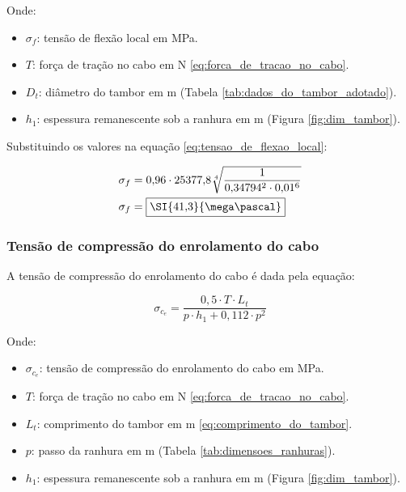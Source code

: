 Onde:

\begin{itemize}
  \item $\sigma_f$: tensão de flexão local em \si{\mega\pascal}.
  \item $T$: força de tração no cabo em \si{\newton} \eqref{eq:forca_de_tracao_no_cabo}.
  \item $D_t$: diâmetro do tambor em \si{\meter} (Tabela \ref{tab:dados_do_tambor_adotado}).
  \item $h_1$: espessura remanescente sob a ranhura em \si{\meter} (Figura \ref{fig:dim_tambor}).
\end{itemize}

\vspace{1em}

Substituindo os valores na equação \eqref{eq:tensao_de_flexao_local}:

\begin{align*}
  \sigma_f & = 0{,}96 \cdot 25377{,}8 \sqrt[4]{\frac{1}{0{,}34794^2 \cdot 0{,}01^6}} \\
  \sigma_f & = \boxed{\SI{41{,}3}{\mega\pascal}}
\end{align*}

\subsubsection{Tensão de compressão do enrolamento do cabo}

A tensão de compressão do enrolamento do cabo é dada pela equação:

\begin{equation}
  \sigma_{c_e} = \frac{0{,}5 \cdot T \cdot L_t}{p \cdot h_1 + 0{,}112 \cdot p^2}
  \label{eq:tensao_de_compressao_do_enrolamento_do_cabo}
\end{equation}

Onde:

\begin{itemize}
  \item $\sigma_{c_e}$: tensão de compressão do enrolamento do cabo em \si{\mega\pascal}.
  \item $T$: força de tração no cabo em \si{\newton} \eqref{eq:forca_de_tracao_no_cabo}.
  \item $L_t$: comprimento do tambor em \si{\meter} \eqref{eq:comprimento_do_tambor}.
  \item $p$: passo da ranhura em \si{\meter} (Tabela \ref{tab:dimensoes_ranhuras}).
  \item $h_1$: espessura remanescente sob a ranhura em \si{\meter} (Figura \ref{fig:dim_tambor}).
\end{itemize}

